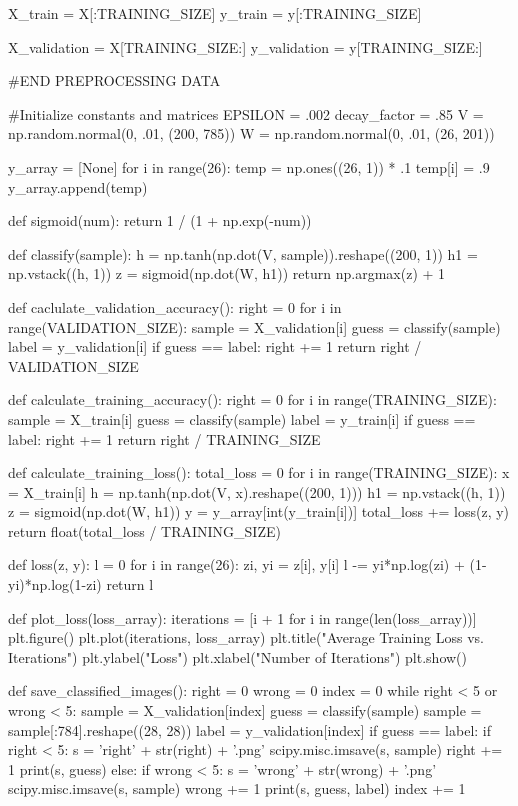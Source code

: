\documentclass{article}
\begin{document}
\begin{python}
X_train = X[:TRAINING_SIZE]
y_train = y[:TRAINING_SIZE]

X_validation = X[TRAINING_SIZE:]
y_validation = y[TRAINING_SIZE:]

#END PREPROCESSING DATA

#Initialize constants and matrices
EPSILON = .002
decay_factor = .85
V = np.random.normal(0, .01, (200, 785))
W = np.random.normal(0, .01, (26, 201))

y_array = [None]
for i in range(26):
    temp = np.ones((26, 1)) * .1
    temp[i] = .9
    y_array.append(temp)

def sigmoid(num):
    return 1 / (1 + np.exp(-num))

def classify(sample):
    h = np.tanh(np.dot(V, sample)).reshape((200, 1))
    h1 = np.vstack((h, 1))
    z = sigmoid(np.dot(W, h1))
    return np.argmax(z) + 1

def caclulate_validation_accuracy():
    right = 0
    for i in range(VALIDATION_SIZE):
        sample = X_validation[i]
        guess = classify(sample)
        label = y_validation[i]
        if guess == label:
            right += 1
    return right / VALIDATION_SIZE

def calculate_training_accuracy():
    right = 0
    for i in range(TRAINING_SIZE):
        sample = X_train[i]
        guess = classify(sample)
        label = y_train[i]
        if guess == label:
            right += 1
    return right / TRAINING_SIZE

def calculate_training_loss():
    total_loss = 0
    for i in range(TRAINING_SIZE):
        x = X_train[i]
        h = np.tanh(np.dot(V, x).reshape((200, 1)))
        h1 = np.vstack((h, 1))
        z = sigmoid(np.dot(W, h1))
        y = y_array[int(y_train[i])]
        total_loss += loss(z, y)
    return float(total_loss / TRAINING_SIZE)

def loss(z, y):
    l = 0
    for i in range(26):
        zi, yi = z[i], y[i]
        l -= yi*np.log(zi) + (1-yi)*np.log(1-zi)
    return l

def plot_loss(loss_array):
    iterations = [i + 1 for i in range(len(loss_array))]
    plt.figure()
    plt.plot(iterations, loss_array)
    plt.title("Average Training Loss vs. Iterations")
    plt.ylabel("Loss")
    plt.xlabel("Number of Iterations")
    plt.show()

def save_classified_images():
    right = 0
    wrong = 0
    index = 0
    while right < 5 or wrong < 5:
        sample = X_validation[index]
        guess = classify(sample)
        sample = sample[:784].reshape((28, 28))
        label = y_validation[index]
        if guess == label:
            if right < 5:
                s = 'right' + str(right) + '.png'
                scipy.misc.imsave(s, sample)
                right += 1
                print(s, guess)
        else:
            if wrong < 5:
                s = 'wrong' + str(wrong) + '.png'
                scipy.misc.imsave(s, sample)
                wrong += 1
                print(s, guess, label)
        index += 1


\end{python}
\end{document}
